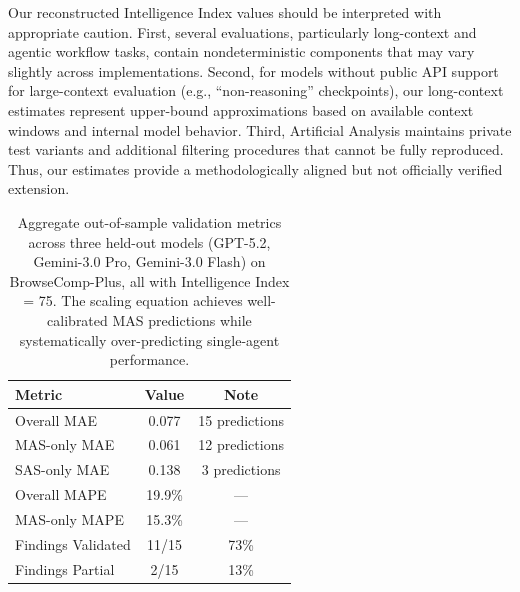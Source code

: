 Our reconstructed Intelligence Index values should be interpreted with appropriate caution.  
First, several evaluations, particularly long-context and agentic workflow tasks, contain nondeterministic components that may vary slightly across implementations.
Second, for models without public API support for large-context evaluation (e.g., ``non-reasoning'' checkpoints), our long-context estimates represent upper-bound approximations based on available context windows and internal model behavior.  
Third, Artificial Analysis maintains private test variants and additional filtering procedures that cannot be fully reproduced. Thus, our estimates provide a methodologically aligned but not officially verified extension.


\begin{table}[t]
\caption{Aggregate out-of-sample validation metrics across three held-out models (GPT-5.2, Gemini-3.0 Pro, Gemini-3.0 Flash) on BrowseComp-Plus, all with Intelligence Index = 75. The scaling equation achieves well-calibrated MAS predictions while systematically over-predicting single-agent performance.}
\label{tab:validation_summary}
\centering
\begin{tabular}{l c c}
\toprule
\textbf{Metric} & \textbf{Value} & \textbf{Note} \\
\midrule
Overall MAE & 0.077 & 15 predictions \\
MAS-only MAE & 0.061 & 12 predictions \\
SAS-only MAE & 0.138 & 3 predictions \\
\midrule
Overall MAPE & 19.9\% & --- \\
MAS-only MAPE & 15.3\% & --- \\
\midrule
Findings Validated & 11/15 & 73\% \\
Findings Partial & 2/15 & 13\% \\
\bottomrule
\end{tabular}
\end{table}


